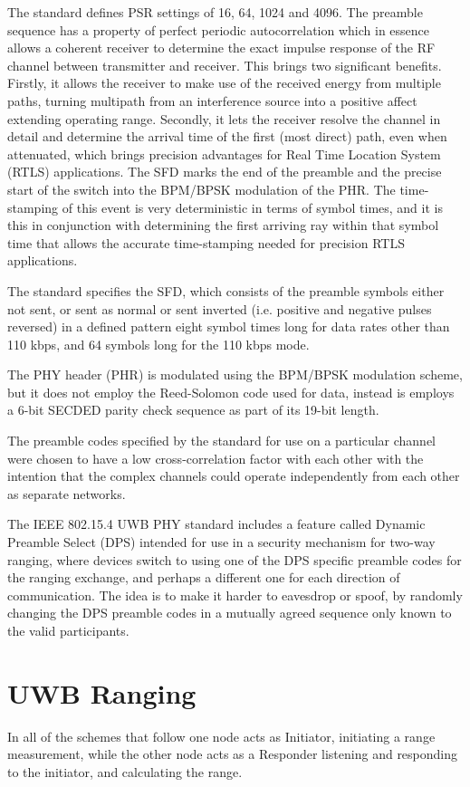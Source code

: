 The standard defines PSR settings of 16, 64, 1024 and 4096. The preamble sequence has a property of perfect periodic autocorrelation \cite{ipatov1979ternary} which in essence allows a coherent receiver to determine the exact impulse response of the RF channel between transmitter and receiver. This brings two significant benefits. Firstly, it allows the receiver to make use of the received energy from multiple paths, turning multipath from an interference source into a positive affect extending operating range. Secondly, it lets the receiver resolve the channel in detail and determine the arrival time of the first (most direct) path, even when attenuated, which brings precision advantages for Real Time Location System (RTLS) applications. 
The SFD marks the end of the preamble and the precise start of the switch into the BPM/BPSK modulation of the PHR. The time-stamping of this event is very deterministic in terms of symbol times, and it is this in conjunction with determining the first arriving ray within that symbol time that allows the accurate time-stamping needed for precision RTLS applications.

The standard specifies the SFD, which consists of the preamble symbols either not sent, or sent as normal or sent inverted (i.e. positive and negative pulses reversed) in a defined pattern eight symbol times long for data rates other than 110 kbps, and 64 symbols long for the 110 kbps mode.

The PHY header (PHR) is modulated using the BPM/BPSK modulation scheme, but it does not employ the Reed-Solomon code used for data, instead is employs a 6-bit SECDED parity check sequence as part of its 19-bit length.

The preamble codes specified by the standard for use on a particular channel were chosen to have a low cross-correlation factor with each other with the intention that the complex channels could operate independently from each other as separate networks.

The IEEE 802.15.4 UWB PHY standard includes a feature called Dynamic Preamble Select (DPS) intended for use in a security mechanism for two-way ranging, where devices switch to using one of the DPS specific preamble codes for the ranging exchange, and perhaps a different one for each direction of communication. The idea is to make it harder to eavesdrop or spoof, by randomly changing the DPS preamble codes in a mutually agreed sequence only known to the valid participants.


\section{UWB Ranging}
In all of the schemes that follow one node acts as Initiator, initiating a range measurement, while the other node acts as a Responder listening and responding to the initiator, and calculating the range. 

